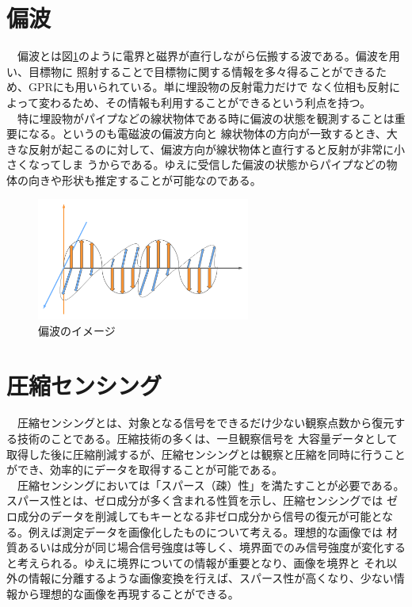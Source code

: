 \documentclass[a4paper,12pt]{jsreport}
\begin{document}
\section{偏波}
　偏波とは図\ref{偏波のイメージ}のように電界と磁界が直行しながら伝搬する波である。偏波を用い、目標物に
照射することで目標物に関する情報を多々得ることができるため、GPRにも用いられている。単に埋設物の反射電力だけで
なく位相も反射によって変わるため、その情報も利用することができるという利点を持つ。
\\　特に埋設物がパイプなどの線状物体である時に偏波の状態を観測することは重要になる。というのも電磁波の偏波方向と
線状物体の方向が一致するとき、大きな反射が起こるのに対して、偏波方向が線状物体と直行すると反射が非常に小さくなってしま
うからである。ゆえに受信した偏波の状態からパイプなどの物体の向きや形状も推定することが可能なのである。
\begin{figure}[h]
  \begin{center}
   \includegraphics[width=7cm]{./image/wave_propagation.pdf}
  \caption{偏波のイメージ}\label{偏波のイメージ}
  \end{center}
  \end{figure}

 \section{圧縮センシング}
　圧縮センシングとは、対象となる信号をできるだけ少ない観察点数から復元する技術のことである。圧縮技術の多くは、一旦観察信号を
大容量データとして取得した後に圧縮削減するが、圧縮センシングとは観察と圧縮を同時に行うことができ、効率的にデータを取得することが可能である。
\\　圧縮センシングにおいては「スパース（疎）性」を満たすことが必要である。スパース性とは、ゼロ成分が多く含まれる性質を示し、圧縮センシングでは
ゼロ成分のデータを削減してもキーとなる非ゼロ成分から信号の復元が可能となる。例えば測定データを画像化したものについて考える。理想的な画像では
材質あるいは成分が同じ場合信号強度は等しく、境界面でのみ信号強度が変化すると考えられる。ゆえに境界についての情報が重要となり、画像を境界と
それ以外の情報に分離するような画像変換を行えば、スパース性が高くなり、少ない情報から理想的な画像を再現することができる。
\end{document}
